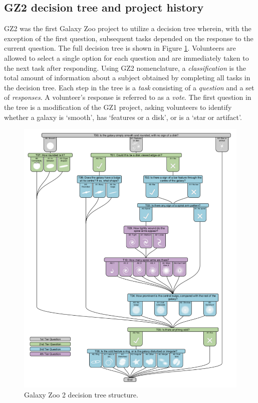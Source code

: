 \subsection{GZ2 decision tree and project history}

GZ2 was the first Galaxy Zoo project to utilize a decision tree wherein, with the exception of the first question, subsequent tasks depended on the response to the current question. The full decision tree is shown in Figure \ref{fig: gz2 decision tree}. Volunteers are allowed to select a single option for each question and are immediately taken to the next task after responding.  Using GZ2 nomenclature, a \textit{classification} is the total amount of information about a subject obtained by completing all tasks in the decision tree. Each step in the tree is a \textit{task} consisting of a \textit{question} and a set of \textit{responses}. A volunteer's response is referred to as a \textit{vote}. The first question in the tree is a modification of the GZ1 project, asking volunteers to identify whether a galaxy is `smooth', has `features or a disk', or is a `star or artifact'. 

\begin{figure}[h!]
\includegraphics[width=\textwidth]{Figures/gz2_tree.pdf}
\caption[Galaxy Zoo 2 decision tree]{Galaxy Zoo 2 decision tree structure.}
\label{fig: gz2 decision tree}
\end{figure}

